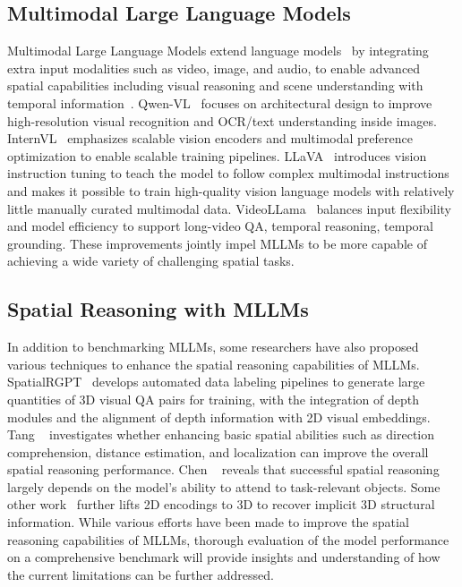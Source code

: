 \subsection{Multimodal Large Language Models}
Multimodal Large Language Models extend language models~\cite{gemini2023,llama2_2023} by integrating extra input modalities such as video, image, and audio, to enable advanced spatial capabilities including visual reasoning and scene understanding with temporal information~\cite{Alayrac2022Flamingo,chen2024internvl}.
Qwen-VL~\cite{bai2025qwen2,qwen3} focuses on architectural design to improve high-resolution visual recognition and OCR/text understanding inside images.
InternVL~\cite{wang2025internvl3,chen2024internvl} emphasizes scalable vision encoders and multimodal preference optimization to enable scalable training pipelines.
LLaVA~\cite{liu2023improvedllava} introduces vision instruction tuning to teach the model to follow complex multimodal instructions and makes it possible to train high-quality vision language models with relatively little manually curated multimodal data.
VideoLLama~\cite{zhang2025videollama} balances input flexibility and model efficiency to support long-video QA, temporal reasoning, temporal grounding.
These improvements jointly impel MLLMs to be more capable of achieving a wide variety of challenging spatial tasks.



\subsection{Spatial Reasoning with MLLMs}
In addition to benchmarking MLLMs, some researchers have also proposed various techniques to enhance the spatial reasoning capabilities of MLLMs.
SpatialRGPT~\cite{cheng2024spatialrgpt} develops automated data labeling pipelines to generate large quantities of 3D visual QA pairs for training, with the integration of depth modules and the alignment of depth information with 2D visual embeddings.
Tang \etal~\cite{tang2025sparkle} investigates whether enhancing basic spatial abilities such as direction comprehension, distance estimation, and localization can improve the overall spatial reasoning performance.
Chen \etal~\cite{chen2025spatial} reveals that successful spatial reasoning largely depends on the model's ability to attend to task-relevant objects.
Some other work~\cite{fan2025vlm,wu2025spatial,zhu2024llava} further lifts 2D encodings to 3D to recover implicit 3D structural information.
While various efforts have been made to improve the spatial reasoning capabilities of MLLMs, thorough evaluation of the model performance on a comprehensive benchmark will provide insights and understanding of how the current limitations can be further addressed.

